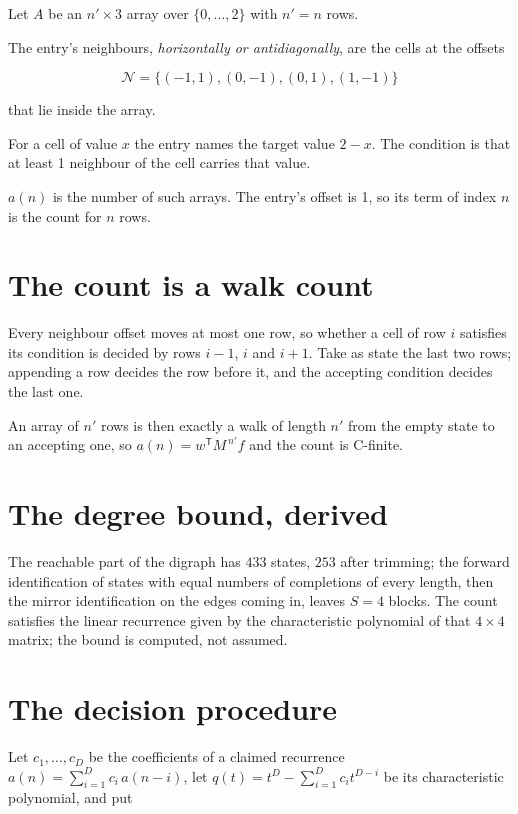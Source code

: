 \documentclass[11pt]{article}
\theoremstyle{definition}
\begin{document}
Let $A$ be an $n' \times 3$ array over $\{0,\dots,2\}$ with $n' = n$ rows.

The entry's neighbours, {\itshape horizontally or antidiagonally}, are the cells at the offsets

\[\mathcal{N} = \{(-1,1), (0,-1), (0,1), (1,-1)\}\]

that lie inside the array.

For a cell of value $x$ the entry names the target value $2 - x$. The condition is that at least 1 neighbour of the cell carries that value.

$a(n)$ is the number of such arrays. The entry's offset is 1, so its term of index $n$ is the count for $n$ rows.

\section{The count is a walk count}

Every neighbour offset moves at most one row, so whether a cell of row $i$ satisfies its condition is decided by rows $i-1$, $i$ and $i+1$. Take as state the last two rows; appending a row decides the row before it, and the accepting condition decides the last one.

An array of $n'$ rows is then exactly a walk of length $n'$ from the empty state to an accepting one, so $a(n) = w^{\mathsf T}M^{\,n'}f$ and the count is C-finite.

\section{The degree bound, derived}

The reachable part of the digraph has $433$ states, $253$ after trimming; the forward identification of states with equal numbers of completions of every length, then the mirror identification on the edges coming in, leaves $S = 4$ blocks. The count satisfies the linear recurrence given by the characteristic polynomial of that $4\times4$ matrix; the bound is computed, not assumed.

\section{The decision procedure}

Let $c_1,\dots,c_D$ be the coefficients of a claimed recurrence $a(n) = \sum_{i=1}^{D} c_i\,a(n-i)$, let $q(t) = t^{D} - \sum_{i=1}^{D} c_i t^{D-i}$ be its characteristic polynomial, and put
\end{document}

